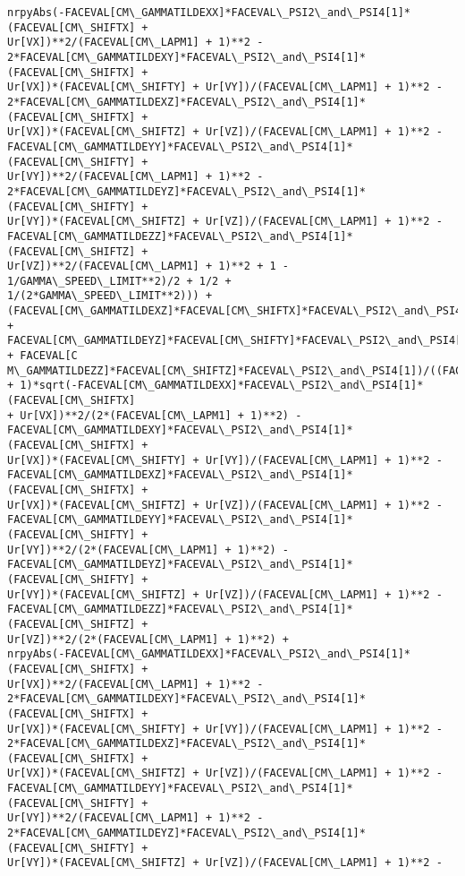 \documentclass[landscape,letterpaper,10pt,english]{article}
\begin{document}
\begin{Verbatim}[commandchars=\\\{\}]
nrpyAbs(-FACEVAL[CM\_GAMMATILDEXX]*FACEVAL\_PSI2\_and\_PSI4[1]*(FACEVAL[CM\_SHIFTX] +
Ur[VX])**2/(FACEVAL[CM\_LAPM1] + 1)**2 -
2*FACEVAL[CM\_GAMMATILDEXY]*FACEVAL\_PSI2\_and\_PSI4[1]*(FACEVAL[CM\_SHIFTX] +
Ur[VX])*(FACEVAL[CM\_SHIFTY] + Ur[VY])/(FACEVAL[CM\_LAPM1] + 1)**2 -
2*FACEVAL[CM\_GAMMATILDEXZ]*FACEVAL\_PSI2\_and\_PSI4[1]*(FACEVAL[CM\_SHIFTX] +
Ur[VX])*(FACEVAL[CM\_SHIFTZ] + Ur[VZ])/(FACEVAL[CM\_LAPM1] + 1)**2 -
FACEVAL[CM\_GAMMATILDEYY]*FACEVAL\_PSI2\_and\_PSI4[1]*(FACEVAL[CM\_SHIFTY] +
Ur[VY])**2/(FACEVAL[CM\_LAPM1] + 1)**2 -
2*FACEVAL[CM\_GAMMATILDEYZ]*FACEVAL\_PSI2\_and\_PSI4[1]*(FACEVAL[CM\_SHIFTY] +
Ur[VY])*(FACEVAL[CM\_SHIFTZ] + Ur[VZ])/(FACEVAL[CM\_LAPM1] + 1)**2 -
FACEVAL[CM\_GAMMATILDEZZ]*FACEVAL\_PSI2\_and\_PSI4[1]*(FACEVAL[CM\_SHIFTZ] +
Ur[VZ])**2/(FACEVAL[CM\_LAPM1] + 1)**2 + 1 - 1/GAMMA\_SPEED\_LIMIT**2)/2 + 1/2 +
1/(2*GAMMA\_SPEED\_LIMIT**2))) +
(FACEVAL[CM\_GAMMATILDEXZ]*FACEVAL[CM\_SHIFTX]*FACEVAL\_PSI2\_and\_PSI4[1] +
FACEVAL[CM\_GAMMATILDEYZ]*FACEVAL[CM\_SHIFTY]*FACEVAL\_PSI2\_and\_PSI4[1] + FACEVAL[C
M\_GAMMATILDEZZ]*FACEVAL[CM\_SHIFTZ]*FACEVAL\_PSI2\_and\_PSI4[1])/((FACEVAL[CM\_LAPM1]
+ 1)*sqrt(-FACEVAL[CM\_GAMMATILDEXX]*FACEVAL\_PSI2\_and\_PSI4[1]*(FACEVAL[CM\_SHIFTX]
+ Ur[VX])**2/(2*(FACEVAL[CM\_LAPM1] + 1)**2) -
FACEVAL[CM\_GAMMATILDEXY]*FACEVAL\_PSI2\_and\_PSI4[1]*(FACEVAL[CM\_SHIFTX] +
Ur[VX])*(FACEVAL[CM\_SHIFTY] + Ur[VY])/(FACEVAL[CM\_LAPM1] + 1)**2 -
FACEVAL[CM\_GAMMATILDEXZ]*FACEVAL\_PSI2\_and\_PSI4[1]*(FACEVAL[CM\_SHIFTX] +
Ur[VX])*(FACEVAL[CM\_SHIFTZ] + Ur[VZ])/(FACEVAL[CM\_LAPM1] + 1)**2 -
FACEVAL[CM\_GAMMATILDEYY]*FACEVAL\_PSI2\_and\_PSI4[1]*(FACEVAL[CM\_SHIFTY] +
Ur[VY])**2/(2*(FACEVAL[CM\_LAPM1] + 1)**2) -
FACEVAL[CM\_GAMMATILDEYZ]*FACEVAL\_PSI2\_and\_PSI4[1]*(FACEVAL[CM\_SHIFTY] +
Ur[VY])*(FACEVAL[CM\_SHIFTZ] + Ur[VZ])/(FACEVAL[CM\_LAPM1] + 1)**2 -
FACEVAL[CM\_GAMMATILDEZZ]*FACEVAL\_PSI2\_and\_PSI4[1]*(FACEVAL[CM\_SHIFTZ] +
Ur[VZ])**2/(2*(FACEVAL[CM\_LAPM1] + 1)**2) +
nrpyAbs(-FACEVAL[CM\_GAMMATILDEXX]*FACEVAL\_PSI2\_and\_PSI4[1]*(FACEVAL[CM\_SHIFTX] +
Ur[VX])**2/(FACEVAL[CM\_LAPM1] + 1)**2 -
2*FACEVAL[CM\_GAMMATILDEXY]*FACEVAL\_PSI2\_and\_PSI4[1]*(FACEVAL[CM\_SHIFTX] +
Ur[VX])*(FACEVAL[CM\_SHIFTY] + Ur[VY])/(FACEVAL[CM\_LAPM1] + 1)**2 -
2*FACEVAL[CM\_GAMMATILDEXZ]*FACEVAL\_PSI2\_and\_PSI4[1]*(FACEVAL[CM\_SHIFTX] +
Ur[VX])*(FACEVAL[CM\_SHIFTZ] + Ur[VZ])/(FACEVAL[CM\_LAPM1] + 1)**2 -
FACEVAL[CM\_GAMMATILDEYY]*FACEVAL\_PSI2\_and\_PSI4[1]*(FACEVAL[CM\_SHIFTY] +
Ur[VY])**2/(FACEVAL[CM\_LAPM1] + 1)**2 -
2*FACEVAL[CM\_GAMMATILDEYZ]*FACEVAL\_PSI2\_and\_PSI4[1]*(FACEVAL[CM\_SHIFTY] +
Ur[VY])*(FACEVAL[CM\_SHIFTZ] + Ur[VZ])/(FACEVAL[CM\_LAPM1] + 1)**2 -

\end{Verbatim}
\end{document}
